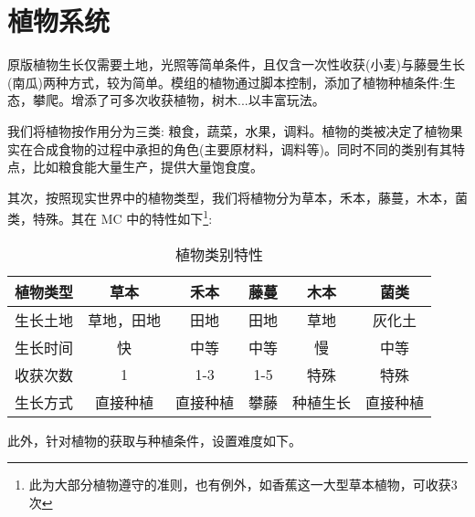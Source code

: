 \section{植物系统}

原版植物生长仅需要土地，光照等简单条件，且仅含一次性收获(小麦)与藤曼生长(南瓜)两种方式，较为简单。模组的植物通过脚本控制，添加了植物种植条件:生态，攀爬。增添了可多次收获植物，树木...以丰富玩法。

我们将植物按作用分为三类: 粮食，蔬菜，水果，调料。植物的类被决定了植物果实在合成食物的过程中承担的角色(主要原材料，调料等)。同时不同的类别有其特点，比如粮食能大量生产，提供大量饱食度。

其次，按照现实世界中的植物类型，我们将植物分为草本，禾本，藤蔓，木本，菌类，特殊。其在 MC 中的特性如下\footnote{此为大部分植物遵守的准则，也有例外，如香蕉这一大型草本植物，可收获3次}:

\begin{table}[H]
    \centering
    \caption{植物类别特性}
    \label{table:植物类别特性}
    \setlength{\tabcolsep}{4mm}
    \begin{tabular}{c|ccccc}
        \toprule
        \textbf{植物类型} & \textbf{草本} & \textbf{禾本} & \textbf{藤蔓} & \textbf{木本} & \textbf{菌类}\\
        \midrule
        生长土地 & 草地，田地 & 田地 & 田地 & 草地 & 灰化土 \\
        生长时间 & 快 & 中等 & 中等 & 慢 & 中等 \\
        收获次数 & 1 & 1-3 & 1-5 & 特殊 & 特殊 \\ 
        生长方式 & 直接种植 & 直接种植 & 攀藤 & 种植生长 & 直接种植 \\
        \bottomrule
    \end{tabular}
\end{table}

此外，针对植物的获取与种植条件，设置难度如下。

